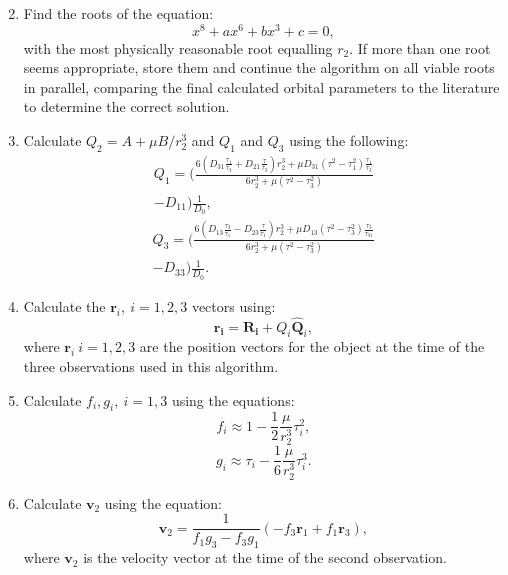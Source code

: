 \documentclass[10pt, twocolumn]{revtex4}    %
\begin{document}
\begin{enumerate}
\begin{equation}
 \end{equation}
 \item Find the roots of the equation:
 \begin{equation}
 x^8 + ax^6 +bx^3 +c = 0,
 \end{equation}
 with the most physically reasonable root equalling $r_2$. If more than one root seems appropriate, store them and continue the algorithm on all viable roots in parallel, comparing the final calculated orbital parameters to the literature to determine the correct solution.
 \item Calculate $Q_2 = A + \mu B/r_2^3$ and $Q_1$ and $Q_3$ using the following:
 \begin{multline} 
 Q_1 = \Bigg( \frac{6 \left(D_{31} \frac{\tau_1}{\tau_3} +D_{21}\frac{\tau}{\tau_3}\right) r^3_2 + \mu D_{31}(\tau^2 -\tau_1^2) \frac{\tau_1}{\tau_3} }{6r_2^3 + \mu(\tau^2-\tau^2_3)} \\
 -D_{11} \Bigg) \frac{1}{D_0} ,
 \end{multline}
 \begin{multline} 
 Q_3 = \Bigg( \frac{6 \left(D_{13} \frac{\tau_3}{\tau_1} -D_{23}\frac{\tau}{\tau_1}\right) r^3_2 + \mu D_{13}(\tau^2 - \tau_3^2) \frac{\tau_3}{\tau_31} }{6r_2^3 + \mu(\tau^2-\tau^2_3)} \\ 
 - D_{33} \Bigg)\frac{1}{D_0} .
 \end{multline}
 \item Calculate the $\mathbf{r}_i,\ i=1,2,3$ vectors using:
 \begin{equation}
 \mathbf{r_i} = \mathbf{R_i} + Q_i \mathbf{\hat{Q}}_i,
 \end{equation}
 where $\mathbf{r}_i\ i=1,2,3$ are the position vectors for the object at the time of the three observations used in this algorithm.
 \item Calculate $f_i,g_i,\ i=1,3$ using the equations:
 \begin{equation}
 f_i \approx 1 - \frac{1}{2}\frac{\mu}{r_2^3}\tau_i^2 ,
 \end{equation}
 \begin{equation}
 g_i \approx \tau_i - \frac{1}{6}\frac{\mu}{r_2^3}\tau_i^3 .
 \end{equation}
 \item Calculate $\mathbf{v}_2$ using the equation:
 \begin{equation}
 \mathbf{v}_2 = \frac{1}{f_1g_3-f_3g_1}(-f_3\mathbf{r}_1+f_1\mathbf{r}_3) ,
 \end{equation}
 where $\mathbf{v}_2$ is the velocity vector at the time of the second observation.

\end{enumerate}
\end{document}
